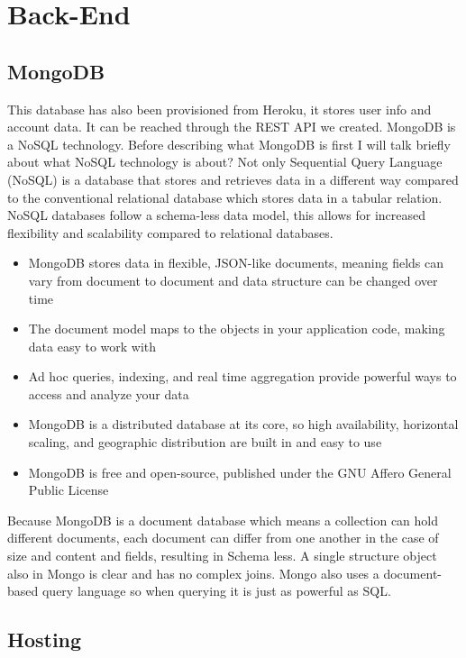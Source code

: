 \section{Back-End}
\subsection{MongoDB}
This database has also been provisioned from Heroku, it stores user info and account data. It can be reached through the REST API we created. MongoDB is a NoSQL technology. Before describing what MongoDB is first I will talk briefly about what NoSQL technology is about? Not only Sequential Query Language (NoSQL) is a database that stores and retrieves data in a different way compared to the conventional relational database which stores data in a tabular relation. NoSQL databases follow a schema-less data model, this allows for increased flexibility and scalability compared to relational databases.
\begin{itemize}
    \item MongoDB stores data in flexible, JSON-like documents, meaning fields can vary from document to document and data structure can be changed over time \cite{mongo}
    \item The document model maps to the objects in your application code, making data easy to work with \cite{mongo}
    \item Ad hoc queries, indexing, and real time aggregation provide powerful ways to access and analyze your data \cite{mongo}
    \item MongoDB is a distributed database at its core, so high availability, horizontal scaling, and geographic distribution are built in and easy to use \cite{mongo}
    \item MongoDB is free and open-source, published under the GNU Affero General Public License \cite{mongo}
\end{itemize}

 Because MongoDB is a document database which means a collection can hold different documents, each document can differ from one another in the case of size and content and fields, resulting in Schema less. A single structure object also in Mongo is clear and has no complex joins. Mongo also uses a document-based query language so when querying it is just as powerful as SQL.
  



\subsection{Hosting}
